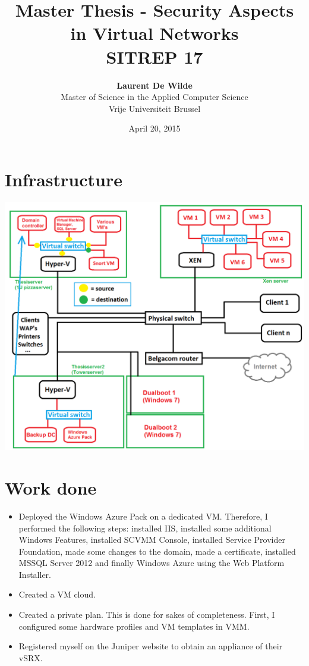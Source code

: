 \documentclass[11pt, a4paper]{article}
\title{Master Thesis -  Security Aspects in Virtual Networks\\ \textbf{SITREP 17}}
\author{\textbf{Laurent De Wilde} \\ Master of Science in the Applied Computer Science \\ Vrije Universiteit Brussel}
\date{April 20, 2015}
\begin{document}
\maketitle

\section{Infrastructure}

\noindent\begin{minipage}{\textwidth}
    \centering
    \includegraphics[width=\textwidth]{Network.png}
\end{minipage}

\section{Work done}

\begin{itemize}
\item Deployed the Windows Azure Pack on a dedicated VM. Therefore, I performed the following steps: installed IIS, installed some additional Windows Features, installed SCVMM Console, installed Service Provider Foundation, made some changes to the domain, made a certificate, installed MSSQL Server 2012 and finally Windows Azure using the Web Platform Installer.
\item Created a VM cloud.
\item Created a private plan. This is done for sakes of completeness. First, I configured some hardware profiles and VM templates in VMM.
\item Registered myself on the Juniper website to obtain an appliance of their vSRX.
\end{itemize}
$\;$ \\ \\
\end{document}
